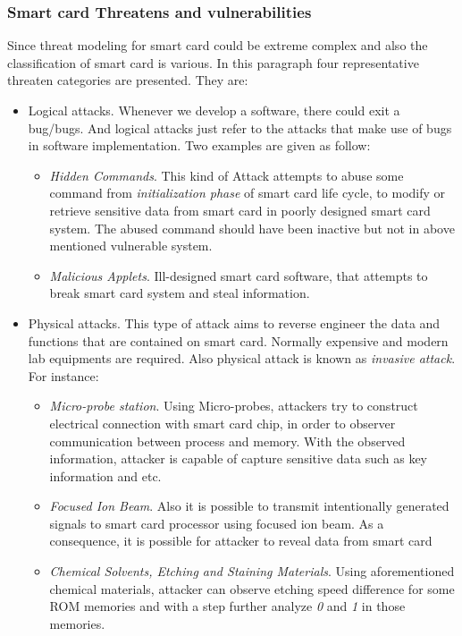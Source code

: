 \subsubsection{Smart card Threatens and vulnerabilities}
Since threat modeling for smart card could be extreme complex and also the classification of smart card is various. In this paragraph four representative threaten categories are presented. They are\cite{smart_card_attack2}:
\begin{itemize}
\item Logical attacks. Whenever we develop a software, there could exit a bug/bugs. And logical attacks just refer to the attacks that make use of bugs in software implementation\cite{smart_card_attack2}. Two examples are given as follow:
\begin{itemize}
\item \emph{Hidden Commands}. This kind of Attack attempts to abuse some command from \emph{initialization phase} of smart card life cycle, to modify or retrieve sensitive data from smart card in poorly designed smart card system. The abused command should have been inactive but not in above mentioned vulnerable system\cite{smart_card_attack2}.
\item \emph{Malicious Applets}. Ill-designed smart card software, that attempts to break smart card system and steal information.
\end{itemize}
\item Physical attacks. This type of attack aims to reverse engineer the data and functions that are contained on smart card. Normally expensive and modern lab equipments are required\cite{smart_card_attack2}. Also physical attack is known as \emph{invasive attack}\cite{smart_card_attack3}. For instance:
\begin{itemize} 
\item \emph{Micro-probe station}. Using Micro-probes, attackers try to construct electrical connection with smart card chip, in order to observer communication between process and memory. With the observed information, attacker is capable of capture sensitive data such as key information and etc\cite{smart_card_attack3}.
\item \emph{Focused Ion Beam}. Also it is possible to transmit intentionally generated signals to smart card processor using focused ion beam. As a consequence, it is possible for attacker to reveal data from smart card\cite{smart_card_attack3}
\item \emph{Chemical Solvents, Etching and Staining Materials}. Using aforementioned chemical materials, attacker can observe etching speed difference for some ROM memories  and with a step further analyze \emph{0} and \emph{1} in those memories\cite{smart_card_attack2}.

\end{itemize}
\end{itemize}
